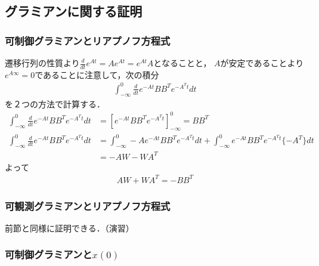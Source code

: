 \subsection{グラミアンに関する証明}

\subsubsection{可制御グラミアンとリアプノフ方程式}

遷移行列の性質より$\frac{d}{dt} e^{At} = A e^{At} = e^{At} A$となることと，
$A$が安定であることより$e^{A \infty}=0$であることに注意して，次の積分
\begin{align}
	\int_{-\infty}^{0} \frac{d}{dt}e^{-At} B B^T e^{-A^T t} d t
\end{align}
を２つの方法で計算する．
\begin{align}
	\int_{-\infty}^{0} \frac{d}{dt}e^{-At} B B^T e^{-A^T t} d t
	&= \left[ e^{-At} B B^T e^{-A^T t} \right]_{-\infty}^0 = B B^T
\\
	\int_{-\infty}^{0} \frac{d}{dt}e^{-At} B B^T e^{-A^T t} d t
	&= \int_{-\infty}^{0}  -A e^{-At} B B^T e^{-A^T t} d t
	   +\int_{-\infty}^{0} e^{-At} B B^T e^{-A^T t} \{-A^T\} d t
\nonumber \\
	&= -A W  - W A^T
\end{align}
よって
\begin{align}
	AW + W A^T = - B B^T
\end{align}

\subsubsection{可観測グラミアンとリアプノフ方程式}

前節と同様に証明できる．（演習）

\subsubsection{可制御グラミアンと$x(0)$}

